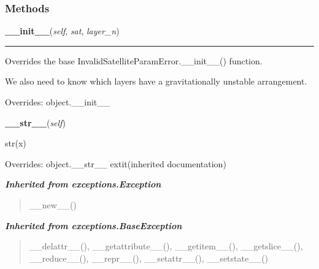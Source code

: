   \subsubsection{Methods}

    \vspace{0.5ex}

\hspace{.8\funcindent}\begin{boxedminipage}{\funcwidth}

    \raggedright \textbf{\_\_init\_\_}(\textit{self}, \textit{sat}, \textit{layer\_n})

    \vspace{-1.5ex}

    \rule{\textwidth}{0.5\fboxrule}
\setlength{\parskip}{2ex}
    Overrides the base InvalidSatelliteParamError.\_\_init\_\_() function.

    We also need to know which layers have a gravitationally unstable 
    arrangement.

\setlength{\parskip}{1ex}
      Overrides: object.\_\_init\_\_

    \end{boxedminipage}

    \vspace{0.5ex}

\hspace{.8\funcindent}\begin{boxedminipage}{\funcwidth}

    \raggedright \textbf{\_\_str\_\_}(\textit{self})

\setlength{\parskip}{2ex}
    str(x)

\setlength{\parskip}{1ex}
      Overrides: object.\_\_str\_\_ 	extit{(inherited documentation)}

    \end{boxedminipage}


\large{\textbf{\textit{Inherited from exceptions.Exception}}}

\begin{quote}
\_\_new\_\_()
\end{quote}

\large{\textbf{\textit{Inherited from exceptions.BaseException}}}

\begin{quote}
\_\_delattr\_\_(), \_\_getattribute\_\_(), \_\_getitem\_\_(), \_\_getslice\_\_(), \_\_reduce\_\_(), \_\_repr\_\_(), \_\_setattr\_\_(), \_\_setstate\_\_()
\end{quote}

